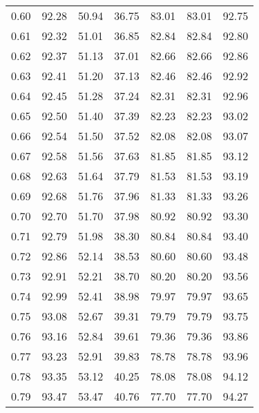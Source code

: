 \begin{tabular}{|c|c|c|c|c|c|c|}
      0.60 &     92.28 &     50.94 &      36.75 &   83.01 &      83.01 &         92.75 \\
      0.61 &     92.32 &     51.01 &      36.85 &   82.84 &      82.84 &         92.80 \\
      0.62 &     92.37 &     51.13 &      37.01 &   82.66 &      82.66 &         92.86 \\
      0.63 &     92.41 &     51.20 &      37.13 &   82.46 &      82.46 &         92.92 \\
      0.64 &     92.45 &     51.28 &      37.24 &   82.31 &      82.31 &         92.96 \\
      0.65 &     92.50 &     51.40 &      37.39 &   82.23 &      82.23 &         93.02 \\
      0.66 &     92.54 &     51.50 &      37.52 &   82.08 &      82.08 &         93.07 \\
      0.67 &     92.58 &     51.56 &      37.63 &   81.85 &      81.85 &         93.12 \\
      0.68 &     92.63 &     51.64 &      37.79 &   81.53 &      81.53 &         93.19 \\
      0.69 &     92.68 &     51.76 &      37.96 &   81.33 &      81.33 &         93.26 \\
      0.70 &     92.70 &     51.70 &      37.98 &   80.92 &      80.92 &         93.30 \\
      0.71 &     92.79 &     51.98 &      38.30 &   80.84 &      80.84 &         93.40 \\
      0.72 &     92.86 &     52.14 &      38.53 &   80.60 &      80.60 &         93.48 \\
      0.73 &     92.91 &     52.21 &      38.70 &   80.20 &      80.20 &         93.56 \\
      0.74 &     92.99 &     52.41 &      38.98 &   79.97 &      79.97 &         93.65 \\
      0.75 &     93.08 &     52.67 &      39.31 &   79.79 &      79.79 &         93.75 \\
      0.76 &     93.16 &     52.84 &      39.61 &   79.36 &      79.36 &         93.86 \\
      0.77 &     93.23 &     52.91 &      39.83 &   78.78 &      78.78 &         93.96 \\
      0.78 &     93.35 &     53.12 &      40.25 &   78.08 &      78.08 &         94.12 \\
      0.79 &     93.47 &     53.47 &      40.76 &   77.70 &      77.70 &         94.27 \\

\end{tabular}
